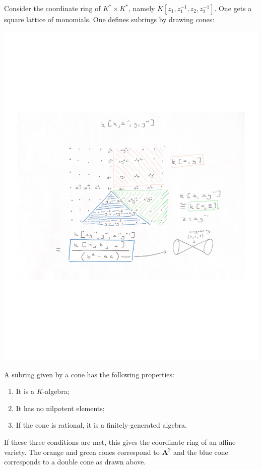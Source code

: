 \documentclass [11 pt, oneside] {article}
\begin{document}
\begin{example}\label{}
Consider the coordinate ring of $K^*\times K^*$, namely $K[z_1,z_1^{-1},z_2,z_2^{-1}]$. One gets a square lattice of monomials. One defines subrings by drawing cones:
\begin{center}
	{\includegraphics[scale=0.8]{images/subring_cone.pdf}}
\end{center}
A subring given by a cone has the following properties:
\begin{enumerate}
	\item It is a $K$-algebra;
	\item It has no nilpotent elements;
	\item If the cone is rational, it is a finitely-generated algebra.
\end{enumerate}
If these three conditions are met, this gives the coordinate ring of an affine variety. The orange and green cones correspond to $\mathbf{A}^2$ and the blue cone corresponds to a double cone as drawn above. 


\end{example}
\end{document}
